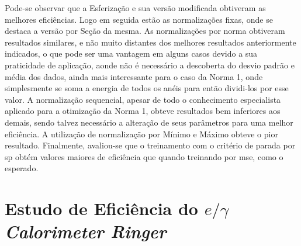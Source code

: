 Pode-se observar que a Esferização e sua versão
modificada obtiveram as melhores eficiências. Logo em seguida estão as
normalizações fixas, onde se destaca a versão por Seção da mesma. As
normalizações por norma obtiveram resultados similares, e não muito distantes
dos melhores resultados anteriormente indicados, o que pode ser uma vantagem em
alguns casos devido a sua praticidade de aplicação, aonde não é necessário a
descoberta do desvio padrão e média dos dados, ainda mais interessante para o
caso da Norma 1, onde simplesmente se soma a energia de todos os anéis para
então dividi-los por esse valor. A normalização sequencial, apesar de todo o
conhecimento especialista aplicado para a otimização da Norma 1, obteve
resultados bem inferiores aos demais, sendo talvez necessário a alteração de
seus parâmetros para uma melhor eficiência. A utilização de normalização por
Mínimo e Máximo obteve o pior resultado. Finalmente, avaliou-se que o
treinamento com o critério de parada por \gls{sp} obtém valores maiores de
eficiência que quando treinando por \gls{mse}, como o esperado.


\section[Estudo de Eficiência do \emph{eGamma Calorimeter Ringer}]{Estudo 
de Eficiência do $e/\gamma$ \emph{Calorimeter Ringer}}
\label{sec:efic_egcalo}

